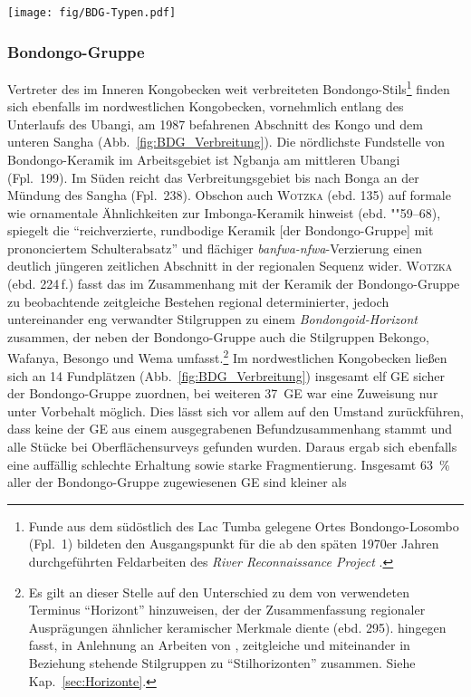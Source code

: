 \begin{figure*}[tb]
	\centering
	\texttt{[image: fig/BDG-Typen.pdf]}
	\caption{Bondongo-Gruppe: Typvertreter aus Loka (Fpl.~193) und \mbox{Ngbanja} (Fpl.~199).\\1:~Taf.~4.1; 2:~Taf.~6.11; 3:~Taf.~3.1; 4:~Taf.~4.3.}
	\label{fig:BDG_Typverteter}
\end{figure*}

\subsubsection{Bondongo-Gruppe}\label{sec:BDG-Gr}

Vertreter des im Inneren Kongobecken weit verbreiteten Bondongo-Stils\footnote{Funde aus dem südöstlich des Lac Tumba  gelegene Ortes Bondongo-Losombo (Fpl.~1) bildeten den Ausgangspunkt für die ab den späten 1970er Jahren durchgeführten Feldarbeiten des \textit{River Reconnaissance Project} \parencites[siehe][]{Sulzmann.1960}{Eggert.1980b}.} \parencites[""128--139]{Wotzka.1995} finden sich ebenfalls im nordwestlichen Kongobecken, vornehmlich entlang des Unterlaufs des \mbox{Ubangi}, am 1987 befahrenen Abschnitt des Kongo und dem unteren \mbox{Sangha} (Abb.~\ref{fig:BDG_Verbreitung}). Die nördlichste Fundstelle von Bondongo-Keramik im Arbeitsgebiet ist \mbox{Ngbanja} am mittleren \mbox{Ubangi} (Fpl.~199). Im Süden reicht das Verbreitungsgebiet bis nach Bonga an der Mündung des \mbox{Sangha} (Fpl.~238). Obschon auch \textsc{Wotzka} (ebd. 135) auf formale wie ornamentale Ähnlichkeiten zur Imbonga-Keramik hinweist (ebd. ""59--68), spiegelt die \enquote{reichverzierte, rundbodige Keramik [der Bondongo-Gruppe] mit prononciertem Schulterabsatz} und flächiger \textit{banfwa-nfwa}-Verzierung einen deutlich jüngeren zeitlichen Abschnitt in der regionalen Sequenz wider. \textsc{Wotzka} (ebd. 224\,f.) fasst das im Zusammenhang mit der Keramik der Bondongo-Gruppe zu beobachtende zeitgleiche Bestehen regional determinierter, jedoch untereinander eng verwandter Stilgruppen zu einem \textit{Bondongoid-Horizont} zusammen, der neben der Bondongo-Gruppe auch die Stilgruppen Bekongo, Wafanya, Besongo und Wema umfasst.\footnote{Es gilt an dieser Stelle auf den Unterschied zu dem von \textcite[285--287]{Eggert.1983} verwendeten Terminus \enquote{Horizont} hinzuweisen, der der Zusammenfassung regionaler Ausprägungen ähnlicher keramischer Merkmale diente (ebd. 295). \textcite[224\,f.]{Wotzka.1995} hingegen fasst, in Anlehnung an Arbeiten von \textcites[108--116]{Kroeber.1944}[49]{Willey.1945}, zeitgleiche und miteinander in Beziehung stehende Stilgruppen zu \enquote{Stilhorizonten} zusammen. Siehe Kap.~\ref{sec:Horizonte}.} Im nordwestlichen Kongobecken ließen sich an 14 Fundplätzen (Abb.~\ref{fig:BDG_Verbreitung}) insgesamt elf GE sicher der Bondongo-Gruppe zuordnen, bei weiteren 37~GE war eine Zuweisung nur unter Vorbehalt möglich. Dies lässt sich vor allem auf den Umstand zurückführen, dass keine der GE aus einem ausgegrabenen Befundzusammenhang stammt und alle Stücke bei Oberflächensurveys gefunden wurden. Daraus ergab sich ebenfalls eine auffällig schlechte Erhaltung sowie starke Fragmentierung. Insgesamt 63~\% aller der Bondongo-Gruppe zugewiesenen GE sind kleiner als 